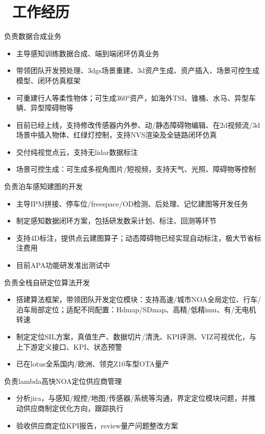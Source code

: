 \documentclass{resume}
\begin{document}
\section{\faUsers\ 工作经历}
\begin{onehalfspacing}

  负责数据合成业务
  \begin{itemize}
    \item 主导感知训练数据合成、端到端闭环仿真业务
    \item 带领团队开发预处理、3dgs场景重建、3d资产生成、资产插入、场景可控生成模型、闭环仿真框架
    \item 可重建行人等柔性物体；可生成360°资产，如海外TSI、锥桶、水马、异型车辆、异型障碍物等
    \item 目前已经上线，支持修改传感器内外参、动/静态障碍物编辑、在2d视频流/3d场景中插入物体、红绿灯控制，支持NVS渲染及全链路闭环仿真
    \item 交付纯视觉点云，支持无lidar数据标注
    \item 场景可控生成：可生成多视角图片/短视频，支持天气、光照、障碍物等控制
  \end{itemize}

  负责泊车感知建图的开发
  \begin{itemize}
    \item 主导IPM拼接、停车位/freespace/OD检测、后处理、记忆建图等开发任务
    \item 制定感知数据闭环方案，包括研发数采计划、标注、回测等环节
    \item 支持4D标注，提供点云建图算子；动态障碍物已经实现自动标注，极大节省标注费用
    \item 目前APA功能研发准出测试中
  \end{itemize}
  负责全栈自研定位算法开发
  \begin{itemize}
    \item {搭建算法框架，带领团队开发定位模块：支持高速/城市NOA全局定位、行车/泊车局部定位；适配不同配置：Hdmap/SDmap、高精/低精imu、有/无电机转速}
    \item 制定定位SIL方案，真值生产、数据切片/清洗、KPI评测、VIZ可视优化，与上下游定义接口、KPI、状态预警
    \item 已在lotus全系国内/欧洲、领克Z10车型OTA量产
  \end{itemize}
  负责lambda高快NOA定位供应商管理
  \begin{itemize}
    \item {分析jira，与感知/规控/地图/传感器/系统等沟通，界定定位模块问题，并推动供应商制定优化方向，跟踪执行}
    \item 验收供应商定位KPI报告，review量产问题整改方案
  \end{itemize}
\end{onehalfspacing}
\end{document}
